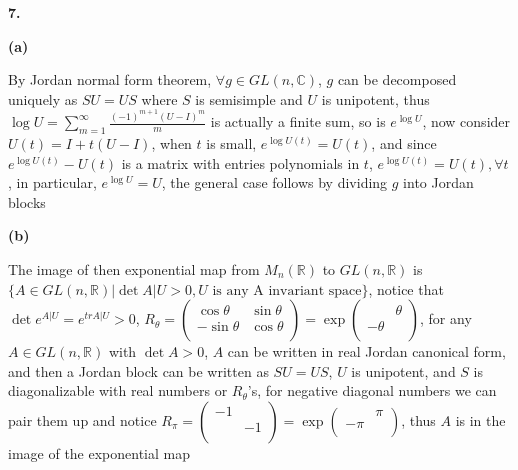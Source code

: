 \documentclass[10pt]{article}
\newcommand{\<}[1]{\langle #1 \rangle}
\begin{document}
\textbf{7.} \par
\textbf{(a)} \par
By Jordan normal form theorem, $\forall g\in GL(n,\mathbb{C})$, $g$ can be decomposed uniquely as $SU=US$ where $S$ is semisimple and $U$ is unipotent, thus $\displaystyle\log U=\sum_{m=1}^{\infty}\frac{(-1)^{m+1}(U-I)^m}{m}$ is actually a finite sum, so is $e^{\log U}$, now consider $U(t)=I+t(U-I)$, when $t$ is small, $e^{\log U(t)}=U(t)$, and since $e^{\log U(t)}-U(t)$ is a matrix with entries polynomials in $t$, $e^{\log U(t)}=U(t), \forall t$, in particular, $e^{\log U}=U$, the general case follows by dividing $g$ into Jordan blocks \par
\textbf{(b)} \par
The image of then exponential map from  $M_n(\mathbb{R})$ to $GL(n,\mathbb{R})$ is $\{A\in GL(n,\mathbb{R})|\det A|U>0, U \text{ is any A invariant space}\}$, notice that $\det e^{A|U}=e^{trA|U}>0$, $R_\theta=\left( {\begin{array}{cc}
   \cos\theta & \sin\theta \\
   -\sin\theta & \cos\theta \\
  \end{array} } \right)=\exp\left( {\begin{array}{cc}
    & \theta \\
   -\theta &  \\
  \end{array} } \right)$, for any $A\in GL(n,\mathbb{R})$ with $\det A>0$, $A$ can be written in real Jordan canonical form, and then a Jordan block can be written as $SU=US$, $U$ is unipotent, and $S$ is diagonalizable with real numbers or $R_\theta$'s, for negative diagonal numbers we can pair them up and notice $R_\pi=\left( {\begin{array}{cc}
   -1 &  \\
    & -1 \\
  \end{array} } \right)=\exp\left( {\begin{array}{cc}
    & \pi \\
   -\pi &  \\
  \end{array} } \right)$, thus $A$ is in the image of the exponential map \par
\end{document}
